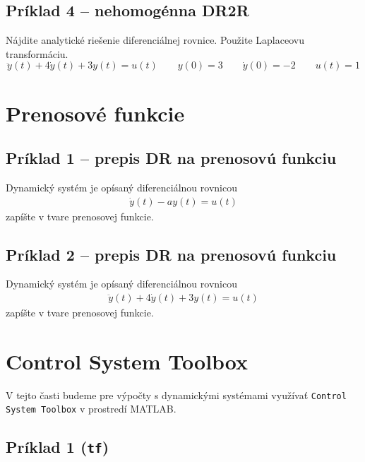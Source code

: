 \documentclass[a4paper, 10pt, ]{article}
\begin{document}
\subsection{Príklad 4 --  nehomogénna DR2R}

Nájdite analytické riešenie diferenciálnej rovnice. Použite Laplaceovu transformáciu.
\begin{equation} 
    \ddot y(t) + 4 \dot y(t) + 3y(t) = u(t)    \qquad y(0) = 3 \qquad \dot y(0) = -2  \qquad u(t) = 1 
\end{equation}




\section{Prenosové funkcie}


\subsection{Príklad 1 -- prepis DR na prenosovú funkciu}

Dynamický systém je opísaný diferenciálnou rovnicou
\begin{align}
    \dot y(t) - a y(t) = u(t) 
\end{align}
zapíšte v tvare prenosovej funkcie.





\subsection{Príklad 2 -- prepis DR na prenosovú funkciu}

Dynamický systém je opísaný diferenciálnou rovnicou
\begin{align}
    \ddot y(t) + 4 \dot y(t) + 3y(t) = u(t)
\end{align}
zapíšte v tvare prenosovej funkcie.





\section{Control System Toolbox}

V tejto časti budeme pre výpočty s dynamickými systémami využívať \texttt{Control System Toolbox} v prostredí MATLAB.





\subsection{Príklad 1 (\lstinline|tf|)}
\end{document}
